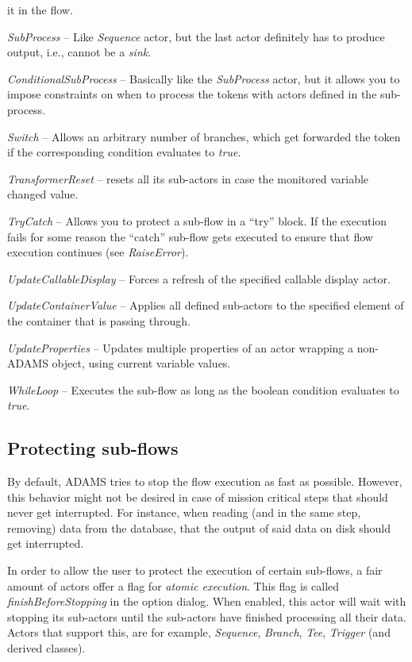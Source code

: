 \begin{tight_itemize}
	it in the flow.
	\item \textit{SubProcess} -- Like \textit{Sequence} actor, but the last actor
	definitely has to produce output, i.e., cannot be a \textit{sink}.
	\item \textit{ConditionalSubProcess} -- Basically like the \textit{SubProcess}
	actor, but it allows you to impose constraints on when to process the tokens
	with actors defined in the sub-process.
	\item \textit{Switch} -- Allows an arbitrary number of branches, which get
	forwarded the token if the corresponding condition evaluates to \textit{true}.
	\item \textit{TransformerReset} -- resets all its sub-actors in case the monitored
	variable changed value.
	\item \textit{TryCatch} -- Allows you to protect a sub-flow in a ``try''
	block. If the execution fails for some reason the ``catch'' sub-flow gets
	executed to ensure that flow execution continues (see \textit{RaiseError}).
	\item \textit{UpdateCallableDisplay} -- Forces a refresh of the specified
	callable display actor.
	\item \textit{UpdateContainerValue} -- Applies all defined sub-actors to the
	specified element of the container that is passing through.
	\item \textit{UpdateProperties} -- Updates multiple properties of an actor
	wrapping a non-ADAMS object, using current variable values.
	\item \textit{WhileLoop} -- Executes the sub-flow as long as the boolean
	condition evaluates to \textit{true}.
\end{tight_itemize}

\subsection{Protecting sub-flows}
By default, ADAMS tries to stop the flow execution as fast as possible. However,
this behavior might not be desired in case of mission critical steps that should
never get interrupted. For instance, when reading (and in the same step, removing)
data from the database, that the output of said data on disk should get 
interrupted. 

In order to allow the user to protect the execution of certain 
sub-flows, a fair amount of actors offer a flag for \textit{atomic execution}.
This flag is called \textit{finishBeforeStopping} in the option dialog. When 
enabled, this actor will wait with stopping its sub-actors until the sub-actors
have finished processing all their data. Actors that support this, are for 
example, \textit{Sequence}, \textit{Branch}, \textit{Tee}, \textit{Trigger} 
(and derived classes).

